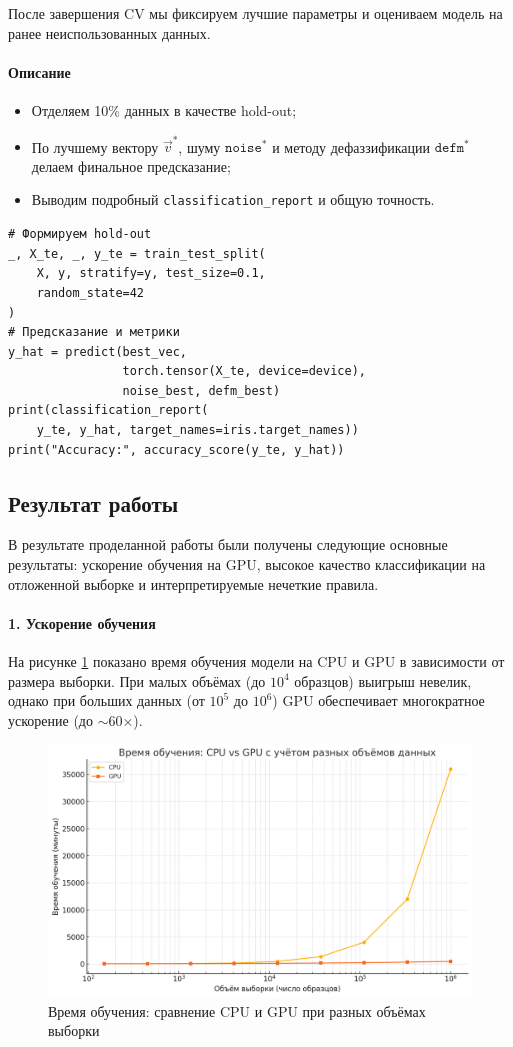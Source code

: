 После завершения CV мы фиксируем лучшие параметры и оцениваем модель на ранее неиспользованных данных.

\paragraph{Описание}  
\begin{itemize}
  \item Отделяем 10\% данных в качестве hold-out;
  \item По лучшему вектору \(\vec v^*\), шуму \(\texttt{noise}^*\) и методу дефаззификации \(\texttt{defm}^*\) делаем финальное предсказание;
  \item Выводим подробный \texttt{classification\_report} и общую точность.
\end{itemize}

\begin{verbatim}
# Формируем hold-out
_, X_te, _, y_te = train_test_split(
    X, y, stratify=y, test_size=0.1,
    random_state=42
)
# Предсказание и метрики
y_hat = predict(best_vec,
                torch.tensor(X_te, device=device),
                noise_best, defm_best)
print(classification_report(
    y_te, y_hat, target_names=iris.target_names))
print("Accuracy:", accuracy_score(y_te, y_hat))
\end{verbatim}

\subsection{Результат работы}

В результате проделанной работы были получены следующие основные результаты: ускорение обучения на GPU, высокое качество классификации на отложенной выборке и интерпретируемые нечеткие правила.

\paragraph{1. Ускорение обучения}  
На рисунке \ref{fig:train_time} показано время обучения модели на CPU и GPU в зависимости от размера выборки. При малых объёмах (до $10^4$ образцов) выигрыш невелик, однако при больших данных (от $10^5$ до $10^6$) GPU обеспечивает многократное ускорение (до $\sim$60×).

\begin{figure}[ht]
  \centering
  \includegraphics[width=0.8\linewidth]{images/training_time.png}
  \caption{Время обучения: сравнение CPU и GPU при разных объёмах выборки}
  \label{fig:train_time}
\end{figure}

